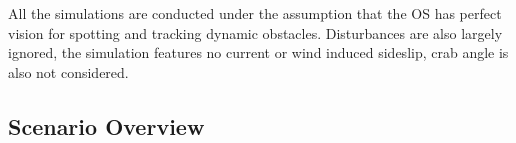 All the simulations are conducted under the assumption that the \gls{OS} has perfect vision for spotting and tracking dynamic obstacles.
Disturbances are also largely ignored, the simulation features no current or wind induced sideslip, crab angle is also not considered.

\subsection{Scenario Overview}





